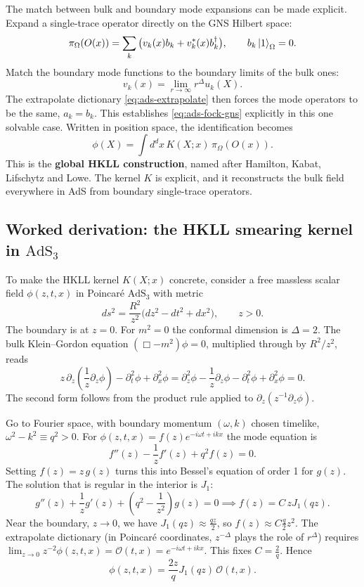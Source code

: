 The match between bulk and boundary mode expansions can be made explicit. Expand a single-trace operator
directly on the GNS Hilbert space:
\[
\pi_\Omega(O(x))=\sum_k\big(v_k(x)b_k+v_k^*(x)b_k^\dagger\big), \qquad b_k\ket1_\Omega=0 .
\]
Match the boundary mode functions to the boundary limits of the bulk ones:
\[
v_k(x)=\lim_{r\to\infty}r^\Delta u_k(X) .
\]
The extrapolate dictionary \eqref{eq:ads-extrapolate} then forces the mode operators to be the same,
$a_k=b_k$. This establishes \eqref{eq:ads-fock-gns} explicitly in this one solvable case. Written in position
space, the identification becomes
\begin{equation}
\phi(X) = \int d^dx\,K(X;x)\,\pi_\Omega(O(x)) .
\label{eq:ads-hkll}
\end{equation}
This is the \textbf{global HKLL construction}, named after Hamilton, Kabat, Lifschytz and Lowe. The kernel $K$ is
explicit, and it reconstructs the bulk field everywhere in AdS from boundary single-trace operators.

\subsection*{Worked derivation: the HKLL smearing kernel in \texorpdfstring{$\text{AdS}_3$}{AdS3}}

To make the HKLL kernel $K(X;x)$ concrete, consider a free massless scalar field $\phi(z,t,x)$ in Poincaré
$\text{AdS}_3$ with metric
\[
ds^2 = \frac{R^2}{z^2}\big(dz^2 - dt^2 + dx^2\big), \qquad z > 0 .
\]
The boundary is at $z=0$. For $m^2=0$ the conformal dimension is $\Delta = 2$. The bulk Klein--Gordon equation
$(\Box - m^2)\phi = 0$, multiplied through by $R^2/z^2$, reads
\[
z\, \partial_z \left(\frac{1}{z}\partial_z \phi\right) - \partial_t^2 \phi + \partial_x^2 \phi
= \partial_z^2 \phi - \frac{1}{z}\partial_z \phi - \partial_t^2 \phi + \partial_x^2 \phi = 0 .
\]
The second form follows from the product rule applied to $\partial_z(z^{-1}\partial_z\phi)$.

Go to Fourier space, with boundary momentum $(\omega, k)$ chosen timelike, $\omega^2 - k^2 \equiv q^2 > 0$. For
$\phi(z,t,x) = f(z) e^{-i\omega t + ikx}$ the mode equation is
\[
f''(z) - \frac{1}{z} f'(z) + q^2 f(z) = 0 .
\]
Setting $f(z) = z\, g(z)$ turns this into Bessel's equation of order 1 for $g(z)$. The solution that is regular
in the interior is $J_1$:
\[
g''(z) + \frac{1}{z} g'(z) + \left(q^2 - \frac{1}{z^2}\right)g(z) = 0 \implies f(z) = C\, z J_1(q z) .
\]
Near the boundary, $z \to 0$, we have $J_1(qz) \approx \frac{qz}{2}$, so $f(z) \approx C \frac{q}{2} z^2$. The
extrapolate dictionary (in Poincaré coordinates, $z^{-\Delta}$ plays the role of $r^{\Delta}$) requires
$\lim_{z\to 0} z^{-2} \phi(z,t,x) = \mathcal{O}(t,x) = e^{-i\omega t + ikx}$. This fixes $C = \frac{2}{q}$. Hence
\[
\phi(z,t,x) = \frac{2 z}{q} J_1(q z)\, \mathcal{O}(t,x) .
\]

